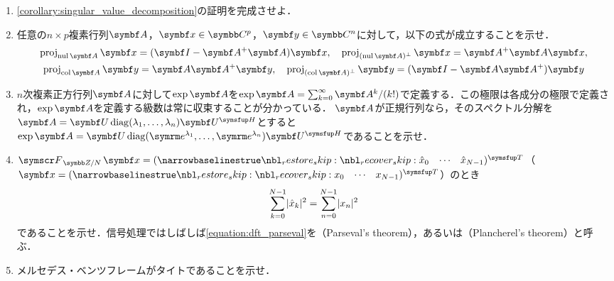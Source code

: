 \documentclass[../../main]{subfiles}
\begin{document}
\begin{enumerate}
  \item \cref{corollary:singular_value_decomposition}の証明を完成させよ．
  \item 任意の\(n\times p\)複素行列\(\mat{A}\)，\(\vect{x}\in\numset{C}^p\)，\(\vect{y}\in\numset{C}^n\)に対して，以下の式が成立することを示せ．
    \begin{gather*}
      \proj_{\nulsp\mat{A}}\vect{x} = (\imat-\pinv{\mat{A}}\mat{A})\vect{x},
      \quad\proj_{\pcomp{(\nulsp\mat{A})}}\vect{x} = \pinv{\mat{A}}\mat{A}\vect{x}, \\
      \proj_{\colsp\mat{A}}\vect{y} = \mat{A}\pinv{\mat{A}}\vect{y},
      \quad\proj_{\pcomp{(\colsp\mat{A})}}\vect{y} = (\imat-\mat{A}\pinv{\mat{A}})\vect{y}
    \end{gather*}
  \item \(n\)次複素正方行列\(\mat{A}\)に対して\(\exp\mat{A}\)を\(\exp\mat{A}=\sum_{k=0}^\infty\mat{A}^k/(k!)\)で定義する．この極限は各成分の極限で定義され，\(\exp\mat{A}\)を定義する級数は常に収束することが分かっている．
    \(\mat{A}\)が正規行列なら，そのスペクトル分解を\(\mat{A}=\mat{U}\diag(\lambda_1,\dots,\lambda_n)\htrps{\mat{U}}\)とすると\(\exp\mat{A}=\mat{U}\diag(\napr^{\lambda_1},\dots,\napr^{\lambda_n})\htrps{\mat{U}}\)であることを示せ．
  \item \(\dft{N}\vect{x}=\trps{\rowvect{\hat{x}_0 & \cdots & \hat{x}_{N-1}}}\)（\(\vect{x}=\trps{\rowvect{x_0 & \cdots & x_{N-1}}}\)）のとき
    \begin{equation}
      \label{equation:dft_parseval}
      \sum_{k=0}^{N-1}\lvert\hat{x}_k\rvert^2 = \sum_{n=0}^{N-1}\lvert x_n\rvert^2
    \end{equation}
    であることを示せ．信号処理ではしばしば\cref{equation:dft_parseval}を（Parseval's theorem），あるいは（Plancherel's theorem）と呼ぶ．  
  \item メルセデス・ベンツフレームがタイトであることを示せ．
\end{enumerate}
\end{document}
